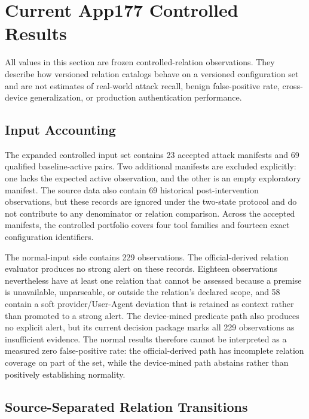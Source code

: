 \section{Current App177 Controlled Results}
\label{sec:current-results}

All values in this section are frozen controlled-relation observations. They describe how versioned relation catalogs behave on a versioned configuration set and are not estimates of real-world attack recall, benign false-positive rate, cross-device generalization, or production authentication performance.

\subsection{Input Accounting}

The expanded controlled input set contains 23 accepted attack manifests and 69 qualified baseline-active pairs. Two additional manifests are excluded explicitly: one lacks the expected active observation, and the other is an empty exploratory manifest. The source data also contain 69 historical post-intervention observations, but these records are ignored under the two-state protocol and do not contribute to any denominator or relation comparison. Across the accepted manifests, the controlled portfolio covers four tool families and fourteen exact configuration identifiers.

The normal-input side contains 229 \appfp observations. The official-derived relation evaluator produces no strong alert on these records. Eighteen observations nevertheless have at least one relation that cannot be assessed because a premise is unavailable, unparseable, or outside the relation's declared scope, and 58 contain a soft provider/User-Agent deviation that is retained as context rather than promoted to a strong alert. The device-mined predicate path also produces no explicit alert, but its current decision package marks all 229 observations as insufficient evidence. The normal results therefore cannot be interpreted as a measured zero false-positive rate: the official-derived path has incomplete relation coverage on part of the set, while the device-mined path abstains rather than positively establishing normality.

\subsection{Source-Separated Relation Transitions}

